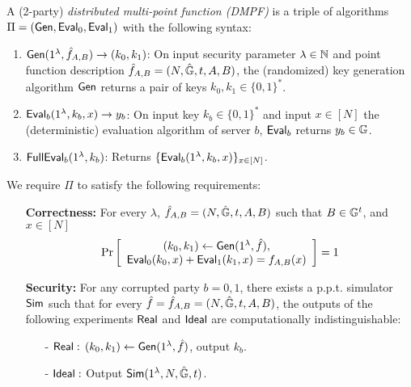 \begin{definition}\label{def:dmpf}
  A 
  (2-party)
  \emph{distributed multi-point function (DMPF)}
  is a triple of algorithms %
  $\Pi=({\sf Gen},{\sf Eval}_0,{\sf Eval}_1)$
  with the following syntax: 
  \begin{enumerate}[itemsep = 5pt]
      \item ${\sf Gen}(1^\lambda,\hat{f}_{A,B})\rightarrow (k_0,k_1)$: On input security parameter $\lambda\in\mathbb{N}$ and point function description $\hat{f}_{A,B}=(N,\hat{\mathbb{G}},t,A,B)$, the (randomized) key generation algorithm ${\sf Gen}$ returns a pair of keys $k_0,k_1\in\{0,1\}^*$. %
      \item ${\sf Eval}_b(1^\lambda, k_b,x)\rightarrow y_b$: On input key $k_b\in\{0,1\}^*$ and input $x\in[N]$ the (deterministic) evaluation algorithm of server $b$, ${\sf Eval}_b$ returns $y_b\in\mathbb{G}$.
      \item ${\sf FullEval}_b(1^\lambda, k_b)$: Returns $\{{\sf Eval}_b(1^\lambda,k_b,x)\}_{x\in [N]}$. 
  \end{enumerate}
  We require $\Pi$ to satisfy the following requirements:
  \begin{itemize}
      \item[] \textbf{Correctness:} For every $\lambda$, $\hat{f}_{A,B}=(N,\hat{\mathbb{G}},t,A,B)$ such that $B\in\mathbb{G}^t$, and $x\in[N]$
      \[
          \Pr\left[\begin{array}{c}(k_0,k_1)\leftarrow{\sf Gen}(1^\lambda,\hat{f}), \\{\sf Eval}_0(k_0,x)+{\sf Eval}_1(k_1,x)=f_{A,B}(x)\end{array}\right]=1
      \]

      \item[] \textbf{Security: }For any corrupted party $b = 0,1$, there exists a p.p.t. simulator $\sf Sim$ such that for every $\hat{f} = \hat{f}_{A,B} = (N,\hat{\mathbb{G}},t,A,B)$, the outputs of the following experiments $\sf Real$ and $\sf Ideal$ are computationally indistinguishable: 
      \begin{itemize}
          \item[-]${\sf Real}:\,(k_0,k_1)\gets {\sf Gen}(1^\lambda, \hat{f})$, output $k_b$. 
          \item[-]$\sf Ideal:$ Output ${\sf Sim}(1^\lambda, N,\hat{\mathbb{G}},t)$. 
      \end{itemize}
  \end{itemize}
  \end{definition}

